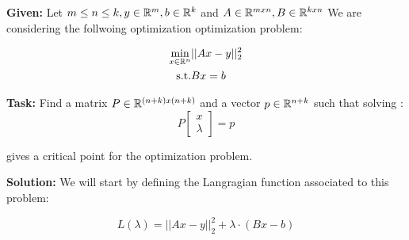 \textbf{Given:} Let $m \leq n \leq k, y \in \mathbb{R}^m, b\in \mathbb{R}^k$ and $A \in \mathbb{R}^{mxn},B \in \mathbb{R}^{kxn}$
We are considering the follwoing optimization optimization problem:

\begin{align*}
    \min_{x \in \mathbb{R}^n} &||Ax-y||_2^2\\
    \text{s.t.}              & Bx=b  
\end{align*}

\textbf{Task:} Find a matrix $P \in \mathbb{R}^{(n+k)x(n+k)}$ and a vector $p \in \mathbb{R}^{n+k}$ such that solving :
\[
P  \begin{bmatrix}  x \\ \lambda \end{bmatrix} =p   
\]

gives a critical point for the optimization problem.

\textbf{Solution:} We will start by defining the Langragian function associated to this problem:

\[
L(\lambda) = ||Ax-y||_2^2 + \lambda \cdot (Bx - b)
\]